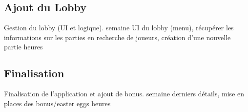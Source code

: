 \documentclass[a4paper,11pt]{article}
\begin{document}
		\subsection{Ajout du Lobby}
		\begin{enumerate}[labelwidth=5em,leftmargin=8em]
			\objectif Gestion du lobby (UI et logique).
			 semaine
			\partageTache UI du lobby (menu), récupérer les informations sur les parties en recherche de joueurs, création d'une nouvelle partie 
			 heures
		\end{enumerate}
		\subsection{Finalisation}
		\begin{enumerate}[labelwidth=5em,leftmargin=8em]
			\objectif Finalisation de l'application et ajout de bonus.
			 semaine
			\partageTache derniers détails, mise en places des bonus/easter eggs
			 heures
		\end{enumerate}
\end{document}
